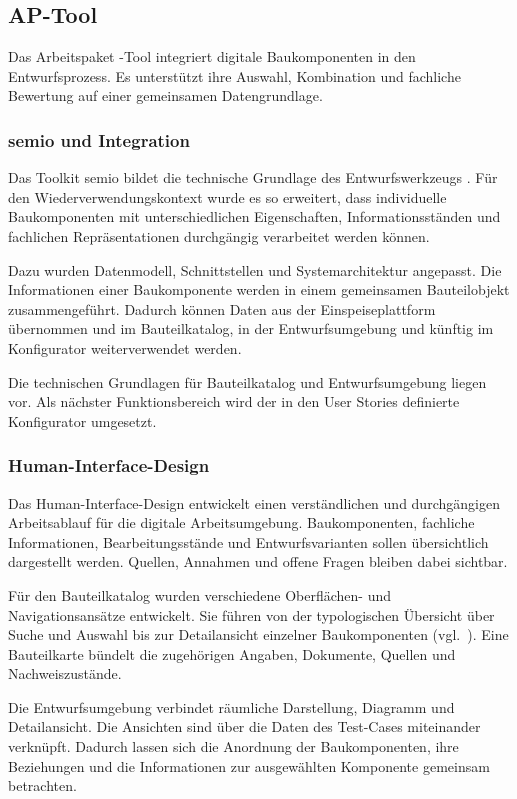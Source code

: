 \documentclass[type=zwischenbericht]{zukunftbau}
\begin{document}
\subsection{AP-Tool}

Das Arbeitspaket -Tool integriert digitale Baukomponenten in den Entwurfsprozess. Es unterstützt ihre Auswahl, Kombination und fachliche Bewertung auf einer gemeinsamen Datengrundlage.

\subsubsection{semio und Integration}
Das Toolkit \Gls{semio} bildet die technische Grundlage des Entwurfswerkzeugs \cite{saluz-semio-2025}. Für den Wiederverwendungskontext wurde es so erweitert, dass individuelle Baukomponenten mit unterschiedlichen Eigenschaften, Informationsständen und fachlichen Repräsentationen durchgängig verarbeitet werden können.

Dazu wurden Datenmodell, Schnittstellen und Systemarchitektur angepasst. Die Informationen einer Baukomponente werden in einem gemeinsamen Bauteilobjekt zusammengeführt. Dadurch können Daten aus der Einspeiseplattform übernommen und im Bauteilkatalog, in der Entwurfsumgebung und künftig im Konfigurator weiterverwendet werden.

Die technischen Grundlagen für Bauteilkatalog und Entwurfsumgebung liegen vor. Als nächster Funktionsbereich wird der in den User Stories definierte Konfigurator umgesetzt.

\subsubsection{Human-Interface-Design}
\label{abschnitt:human-interface-design}
Das \Gls{Human-Interface-Design} entwickelt einen verständlichen und durchgängigen Arbeitsablauf für die digitale Arbeitsumgebung. Baukomponenten, fachliche Informationen, Bearbeitungsstände und Entwurfsvarianten sollen übersichtlich dargestellt werden. Quellen, Annahmen und offene Fragen bleiben dabei sichtbar.

Für den Bauteilkatalog wurden verschiedene Oberflächen- und Navigationsansätze entwickelt. Sie führen von der typologischen Übersicht über Suche und Auswahl bis zur Detailansicht einzelner Baukomponenten (vgl.\ ). Eine Bauteilkarte bündelt die zugehörigen Angaben, Dokumente, Quellen und Nachweiszustände.

Die Entwurfsumgebung verbindet räumliche Darstellung, Diagramm und Detailansicht. Die Ansichten sind über die Daten des \Gls{Test-Case}s miteinander verknüpft. Dadurch lassen sich die Anordnung der Baukomponenten, ihre Beziehungen und die Informationen zur ausgewählten Komponente gemeinsam betrachten.
\end{document}

